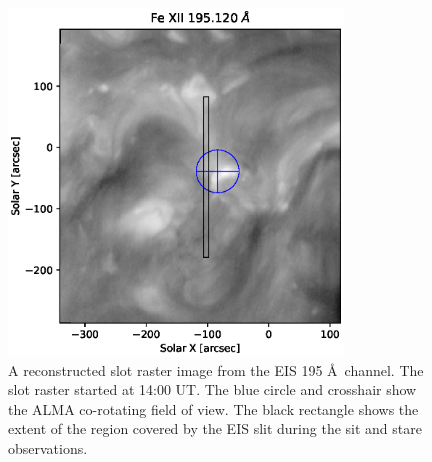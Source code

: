 \documentclass[twocolumn]{aastex62}
\begin{document}
\begin{figure}
    \centering
    \includegraphics[width=3.5in]{figures/EIS_example.eps}
    \caption{A reconstructed slot raster image from the EIS  195 \AA\ channel. The slot raster started at 14:00 UT.  The blue circle and crosshair show the ALMA co-rotating field of view.  The black rectangle shows the extent of the region covered by the EIS slit during the sit and stare observations.}
    \label{fig:EIS}
\end{figure}
\end{document}
